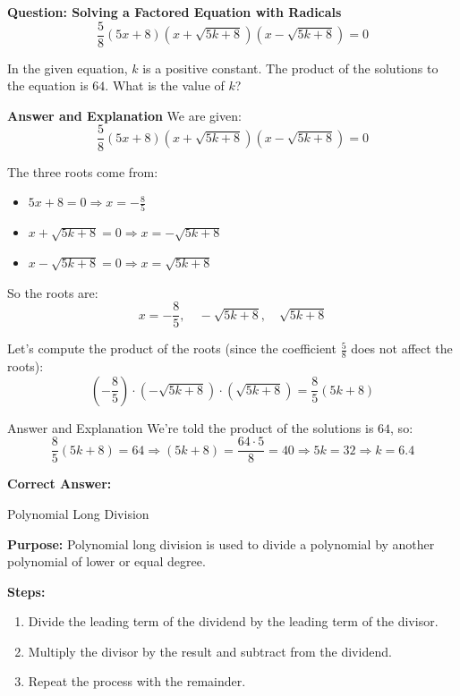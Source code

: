 \documentclass{beamer}
\begin{document}
\begin{frame}{\textbf{Question: Solving a Factored Equation with Radicals}}
\[
\frac{5}{8}(5x + 8)\left(x + \sqrt{5k + 8}\right)\left(x - \sqrt{5k + 8}\right) = 0
\]

In the given equation, $k$ is a positive constant. The product of the solutions to the equation is $64$. What is the value of $k$?
\end{frame}


\begin{frame}{\textbf{Answer and Explanation}}
We are given:
\[
\frac{5}{8}(5x + 8)(x + \sqrt{5k + 8})(x - \sqrt{5k + 8}) = 0
\]

The three roots come from:
\begin{itemize}
    \item $5x + 8 = 0 \Rightarrow x = -\frac{8}{5}$
    \item $x + \sqrt{5k + 8} = 0 \Rightarrow x = -\sqrt{5k + 8}$
    \item $x - \sqrt{5k + 8} = 0 \Rightarrow x = \sqrt{5k + 8}$
\end{itemize}

So the roots are:
\[
x = -\frac{8}{5},\quad -\sqrt{5k + 8},\quad \sqrt{5k + 8}
\]

Let’s compute the product of the roots (since the coefficient $\frac{5}{8}$ does not affect the roots):
\[
\left(-\frac{8}{5}\right) \cdot \left(-\sqrt{5k + 8}\right) \cdot \left(\sqrt{5k + 8}\right) = \frac{8}{5}(5k + 8)
\]


\end{frame}
\begin{frame}{Answer and Explanation}
We're told the product of the solutions is $64$, so:
\[
\frac{8}{5}(5k + 8) = 64
\Rightarrow (5k + 8) = \frac{64 \cdot 5}{8} = 40
\Rightarrow 5k = 32 \Rightarrow k = \boxed{6.4}
\]

\textbf{Correct Answer:} 
\end{frame}

\begin{frame}{Polynomial Long Division}
\small

\textbf{Purpose:}  
Polynomial long division is used to divide a polynomial by another polynomial of lower or equal degree.

\vspace{0.3cm}
\textbf{Steps:}
\begin{enumerate}
    \item Divide the leading term of the dividend by the leading term of the divisor.
    \item Multiply the divisor by the result and subtract from the dividend.
    \item Repeat the process with the remainder.
\end{enumerate}



\end{frame}
\end{document}
